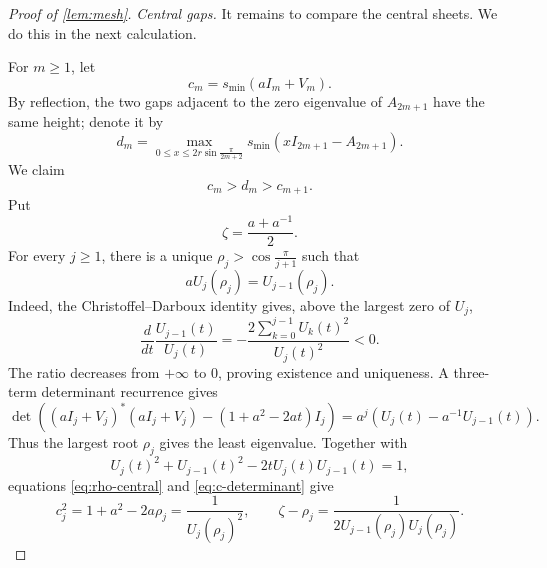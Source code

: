 \documentclass[review,hidelinks,onefignum,onetabnum]{siamart251216}
\begin{document}
\begin{proof}[Proof of \cref{lem:mesh}]
\medskip\noindent\emph{Central gaps.}\quad
It remains to compare the central sheets.  We do this in the next
calculation.

For \(m\geq1\), let
\begin{equation}\label{eq:c-height-def}
 c_m=s_{\min}(aI_m+V_m).
\end{equation}
By reflection, the two gaps adjacent to the zero eigenvalue of
\(A_{2m+1}\) have the same height; denote it by
\begin{equation}\label{eq:d-height-def}
 d_m=\max_{0\leq x\leq2r\sin\frac{\pi}{2m+2}}
 s_{\min}(xI_{2m+1}-A_{2m+1}).
\end{equation}
We claim
\begin{equation}\label{eq:central-interlace}
 c_m>d_m>c_{m+1}.
\end{equation}
Put
\[
 \zeta=\frac{a+a^{-1}}2.
\]
For every \(j\geq1\), there is a unique
\(\rho_j>\cos\frac{\pi}{j+1}\) such that
\begin{equation}\label{eq:rho-central}
 aU_j(\rho_j)=U_{j-1}(\rho_j).
\end{equation}
Indeed, the Christoffel--Darboux identity gives, above the largest zero
of \(U_j\),
\[
 \frac{d}{dt}\frac{U_{j-1}(t)}{U_j(t)}
 =-\frac{2\sum_{k=0}^{j-1}U_k(t)^2}{U_j(t)^2}<0.
\]
The ratio decreases from \(+\infty\) to \(0\), proving existence and
uniqueness.  A three-term determinant recurrence gives
\begin{equation}\label{eq:c-determinant}
 \det\left((aI_j+V_j)^*(aI_j+V_j)
 -(1+a^2-2at)I_j\right)
 =a^j\left(U_j(t)-a^{-1}U_{j-1}(t)\right).
\end{equation}
Thus the largest root \(\rho_j\) gives the least eigenvalue.  Together
with
\[
 U_j(t)^2+U_{j-1}(t)^2-2tU_j(t)U_{j-1}(t)=1,
\]
equations \eqref{eq:rho-central} and \eqref{eq:c-determinant} give
\begin{equation}\label{eq:c-rho-identities}
 c_j^2=1+a^2-2a\rho_j=\frac1{U_j(\rho_j)^2},\qquad
 \zeta-\rho_j=\frac1{2U_{j-1}(\rho_j)U_j(\rho_j)}.
\end{equation}


\end{proof}
\end{document}
